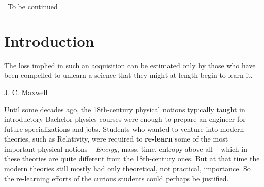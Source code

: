 \documentclass[a4paper,12pt,%
onecolumn,oneside,titlepage,%
british%
]{memoir}
\renewcommand*{\finalnamedelim}{\addspace\amp\space}
\newcommand*{\amp}{\&}
\newcommand{\addchap}[1]{\chapter*[#1]{#1}\addcontentsline{toc}{chapter}{#1}}
\newcommand{\mynotew}[1]{{\footnotesize\color{midgrey}\faIcon{tools}\ #1}}
\renewcommand*{\|}[1][]{\nonscript\:#1\vert\nonscript\:\mathopen{}}
\begin{document}
\mynotew{To be continued}

\printpagenotes*
\clearpage
\renewcommand*{\bibmark}{\markboth{\bibname}{}}
\bibmark
\renewcommand*{\finalnamedelim}{\addcomma\space}


\printbibliography[prenote=prenote%
]

\iffalse
\newpage
\addchap{Introduction}
\label{sec:intro}

\epigraph{The loss implied in such an acquisition can be estimated only by those who have been compelled to unlearn a science that they might at length begin to learn it.}{J. C. Maxwell \cites*{maxwell1878}}



Until some decades ago, the 18th-century physical notions typically taught in introductory Bachelor physics courses were enough to prepare an engineer for future specializations and jobs. Students who wanted to venture into modern theories, such as Relativity, were required to \textbf{re-learn} some of the most important physical notions -- \emph{Energy}, mass, time, entropy above all -- which in these theories are quite different from the 18th-century ones. But at that time the modern theories  still mostly had only theoretical, not practical, importance. So the re-learning efforts of the curious students could perhaps be justified.
\end{document}
